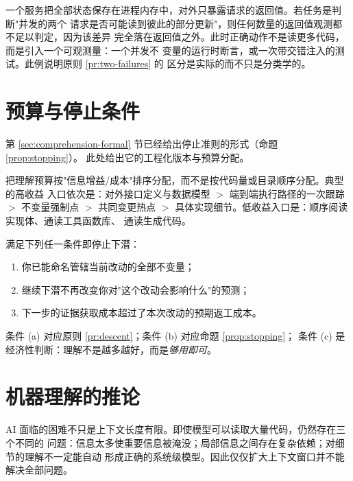 \begin{example}[秩亏的典型形态]\label{ex:rank-deficient}
一个服务把全部状态保存在进程内存中，对外只暴露请求的返回值。若任务是判断"并发的两个
请求是否可能读到彼此的部分更新"，则任何数量的返回值观测都不足以判定，因为该差异
完全落在返回值之外。此时正确动作不是读更多代码，而是引入一个可观测量：一个并发不
变量的运行时断言，或一次带交错注入的测试。此例说明原则 \ref{pr:two-failures} 的
区分是实际的而不只是分类学的。
\end{example}

\section{预算与停止条件}\label{sec:budget}

第 \ref{sec:comprehension-formal} 节已经给出停止准则的形式（命题 \ref{prop:stopping}）。
此处给出它的工程化版本与预算分配。

\begin{principle}[下潜预算分配]\label{pr:descent-budget}
把理解预算按"信息增益/成本"排序分配，而不是按代码量或目录顺序分配。典型的高收益
入口依次是：对外接口定义与数据模型 $>$ 端到端执行路径的一次跟踪 $>$ 不变量强制点
$>$ 共同变更热点 $>$ 具体实现细节。低收益入口是：顺序阅读实现体、通读工具函数库、
通读生成代码。
\end{principle}

\begin{principle}[停止条件]\label{pr:stop}
满足下列任一条件即停止下潜：
\begin{enumerate}[label=(\alph*)]
\item 你已能命名管辖当前改动的全部不变量；
\item 继续下潜不再改变你对"这个改动会影响什么"的预测；
\item 下一步的证据获取成本超过了本次改动的预期返工成本。
\end{enumerate}
\end{principle}

条件 (a) 对应原则 \ref{pr:descent}；条件 (b) 对应命题 \ref{prop:stopping}；
条件 (c) 是经济性判断：理解不是越多越好，而是\emph{够用即可}。

\section{机器理解的推论}\label{sec:ai-comprehension}

AI 面临的困难不只是上下文长度有限。即使模型可以读取大量代码，仍然存在三个不同的
问题：信息太多使重要信息被淹没；局部信息之间存在复杂依赖；对细节的理解不一定能自动
形成正确的系统级模型。因此仅仅扩大上下文窗口并不能解决全部问题。

